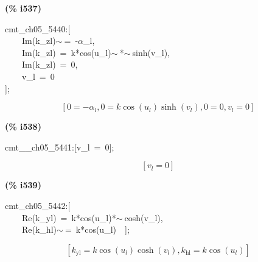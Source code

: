 \documentclass[fleqn]{article}
\begin{document}
\noindent
\begin{minipage}[t]{4.000000em}\color{red}\bfseries
(\% i537)	
\end{minipage}
\begin{minipage}[t]{\textwidth}\color{blue}
cmt\_ch05\_5440:[\\
\ \ \ \ Im(k\_zl)\ensuremath{\sim\ }=\ -\ensuremath{\alpha}\_l,\\
\ \ \ \ Im(k\_zl)\ =\ k*cos(u\_l)\ensuremath{\sim\ }*\ensuremath{\sim\ }sinh(v\_l),\\
\ \ \ \ Im(k\_zl)\ =\ 0,\\
\ \ \ \ v\_l\ =\ 0\\
];
\end{minipage}
\[\displaystyle \tag{\% o537} 
\left[ 0=-{{\alpha }_l}\operatorname{,}0=k \cos{\left( {u_l}\right) } \sinh{\left( {v_l}\right) }\operatorname{,}0=0\operatorname{,}{v_l}=0\right] \mbox{}
\]


\noindent
\begin{minipage}[t]{4.000000em}\color{red}\bfseries
(\% i538)	
\end{minipage}
\begin{minipage}[t]{\textwidth}\color{blue}
cmt\_\_ch05\_5441:[v\_l\ =\ 0];
\end{minipage}
\[\displaystyle \tag{\% o538} 
\left[ {v_l}=0\right] \mbox{}
\]


\noindent
\begin{minipage}[t]{4.000000em}\color{red}\bfseries
(\% i539)	
\end{minipage}
\begin{minipage}[t]{\textwidth}\color{blue}
cmt\_ch05\_5442:[\\
\ \ \ \ Re(k\_yl)\ =\ k*cos(u\_l)*\ensuremath{\sim\ }cosh(v\_l),\\
\ \ \ \ Re(k\_hl)\ensuremath{\sim\ }=\ k*cos(u\_l)\ \ ];
\end{minipage}
\[\displaystyle \tag{\% o539} 
\left[ {k_{\ensuremath{\mathrm{yl}}}}=k \cos{\left( {u_l}\right) } \cosh{\left( {v_l}\right) }\operatorname{,}{k_{\ensuremath{\mathrm{hl}}}}=k \cos{\left( {u_l}\right) }\right] \mbox{}
\]
\end{document}
